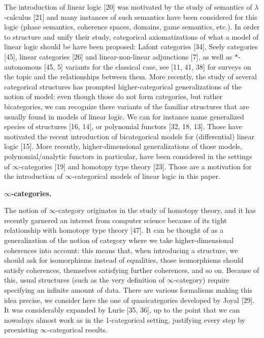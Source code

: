 \documentclass[10pt,a4paper]{article}
\begin{document}
The introduction of linear logic [20] was motivated by the study of semantics of $\lambda$-calculus [21] and many instances of such semantics have been considered for this logic (phase semantics, coherence spaces, domains, game semantics, etc.). In order to structure and unify their study, categorical axiomatizations of what a model of linear logic should be have been proposed: Lafont categories [34], Seely categories [45], linear categories [26] and linear-non-linear adjunctions [7], as well as $*$-autonomous [45, 5] variants for the classical case, see [11, 41, 38] for surveys on the topic and the relationships between them. More recently, the study of several categorical structures has prompted higher-categorical generalizations of the notion of model: even though those do not form categories, but rather bicategories, we can recognize there variants of the familiar structures that are usually found in models of linear logic. We can for instance name generalized species of structures [16, 14], or polynomial functors [32, 18, 13]. Those have motivated the recent introduction of bicategorical models for (differential) linear logic [15]. More recently, higher-dimensional generalizations of those models, polynomial/analytic functors in particular, have been considered in the settings of $\infty$-categories [19] and homotopy type theory [23]. Those are a motivation for the introduction of $\infty$-categorical models of linear logic in this paper.\par
 
 
 
 
\par\medskip\noindent\textbf{$\infty$-categories.}\par
 
 
The notion of $\infty$-category originates in the study of homotopy theory, and it has recently garnered an interest from computer science because of its tight relationship with homotopy type theory [47]. It can be thought of as a generalization of the notion of category where we take higher-dimensional coherences into account: this means that, when introducing a structure, we should ask for isomorphisms instead of equalities, those isomorphisms should satisfy coherences, themselves satisfying further coherences, and so on. Because of this, usual structures (such as the very definition of $\infty$-category) require specifying an infinite amount of data. There are various formalisms making this idea precise, we consider here the one of quasicategories developed by Joyal [29]. It was considerably expanded by Lurie [35, 36], up to the point that we can nowadays almost work as in the 1-categorical setting, justifying every step by preexisting $\infty$-categorical results.\par
 
\end{document}
